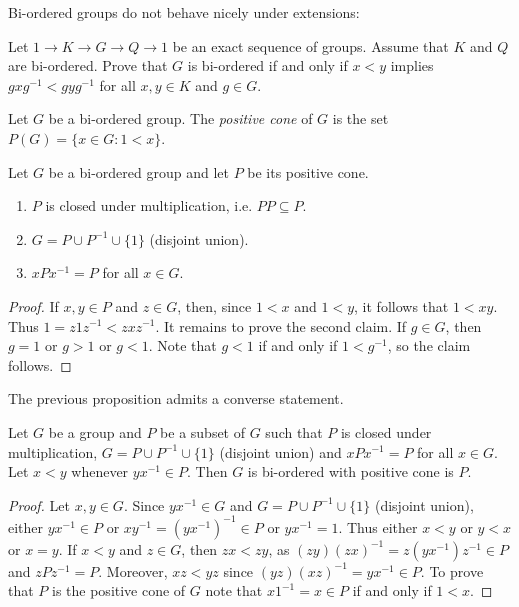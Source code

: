 Bi-ordered groups do not behave nicely under extensions:

\begin{exercise}
\label{xca:BO_sequence}
    Let $1\to K\to G\to Q\to 1$ be an exact sequence of groups. Assume that $K$ and $Q$ 
    are bi-ordered. Prove that $G$ is bi-ordered if and only if 
    $x<y$ implies $gxg^{-1}<gyg^{-1}$ for all $x,y\in K$ and $g\in G$. 
\end{exercise}

\begin{definition}
	Let $G$ be a bi-ordered group. The \emph{positive cone} of $G$  
	is the set $P(G)=\{x\in
	G:1<x\}$.
\end{definition}

\begin{proposition}
	\label{pro:biordenableP1}
	Let $G$ be a bi-ordered group and let $P$ be its positive cone. 
	\begin{enumerate}
		\item $P$ is closed under multiplication, i.e. $PP\subseteq P$. 
		\item $G=P\cup P^{-1}\cup \{1\}$ (disjoint union).
		\item $xPx^{-1}=P$ for all $x\in G$.
	\end{enumerate}
\end{proposition}

\begin{proof}
	If $x,y\in P$ and $z\in G$, then, since $1<x$ and $1<y$, it follows that 
	$1<xy$.  Thus $1=z1z^{-1}<zxz^{-1}$. It remains to prove the second claim.  
	If $g\in G$, then $g=1$ or $g>1$ or $g<1$. Note that $g<1$ if and only if 
	$1<g^{-1}$, so the claim follows. 
\end{proof}

The previous proposition admits a converse statement. 

\begin{proposition}
	\label{pro:biordenableP2}
	Let $G$ be a group and $P$ be a subset of $G$ such that 
	$P$ is closed under multiplication, $G=P\cup P^{-1}\cup \{1\}$ (disjoint union) and
	$xPx^{-1}=P$ for all $x\in G$. Let $x<y$ whenever  
	$yx^{-1}\in P$. Then $G$ is bi-ordered with positive
	cone is $P$.
\end{proposition}

\begin{proof}
	Let $x,y\in G$. Since $yx^{-1}\in G$ and $G=P\cup
	P^{-1}\cup\{1\}$ (disjoint union), 
	either $yx^{-1}\in P$ or $xy^{-1}=(yx^{-1})^{-1}\in
	P$ or $yx^{-1}=1$. Thus either $x<y$ or $y<x$ or $x=y$. If $x<y$ and $z\in
	G$, then $zx<zy$, as $(zy)(zx)^{-1}=z(yx^{-1})z^{-1}\in P$ and  
	$zPz^{-1}=P$. Moreover, $xz<yz$ since $(yz)(xz)^{-1}=yx^{-1}\in P$. To prove
	that $P$ is the positive cone of $G$ note that 
	$x1^{-1}=x\in P$ if and only if $1<x$. 
\end{proof}

